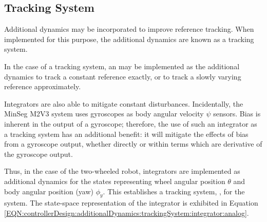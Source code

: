 \documentclass[crop=false,float=true,class=scrreprt]{standalone}
\begin{document}
\subsection{Tracking System}
\label{SEC:controllerDesign:additionalDynamics:trackingSystem}

Additional dynamics may be incorporated to improve reference tracking.
When implemented for this purpose, the additional dynamics are known as a tracking system.

In the case of a tracking system, 
an  may be implemented as the additional dynamics
to track a constant reference exactly, or 
to track a slowly varying reference approximately.

Integrators are also able to mitigate constant disturbances.
Incidentally, the MinSeg M2V3 system uses gyroscopes as body angular velocity $\psi$ sensors.
Bias is inherent in the output of a gyroscope;
therefore, the use of such an integrator as a tracking system has an additional benefit:
it will mitigate the effects of bias from a gyroscope output, 
whether directly or within terms which are derivative of the gyroscope output.

Thus, in the case of the two-wheeled robot, 
integrators are implemented as additional dynamics for the states representing 
wheel angular position $\theta$ and body angular position (yaw) $\phi_{y}$.
This establishes a tracking system, {}, for the system.
The state-space representation of the integrator is exhibited in Equation~%
\eqref{EQN:controllerDesign:additionalDynamics:trackingSystem:integrator:analog}.

\vspace{-0em}
\end{document}

